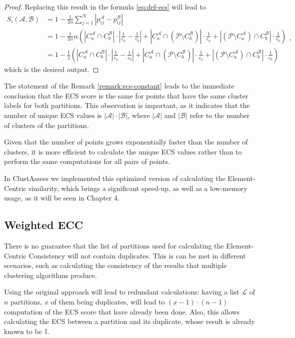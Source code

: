 \begin{proof}
    Replacing this result in the formula \ref{eq:def-ecs} will lead to
    \[
    \begin{aligned}
        S_i (\mathcal{A}, \mathcal{B}) &= 1 - \frac{1}{2 \alpha} \sum_{j = 1}^N |p_{ij}^{\mathcal{A}} - p_{ij}^{\mathcal{B}} |  \\
        &= 1 - \frac{1}{2\alpha}\alpha\left( |C_a^\mathcal{A} \cap C_b^\mathcal{B}|\cdot \left|\frac{1}{c_a} - \frac{1}{c_b}\right| + |C_a^\mathcal{A} \cap (\mathcal{P} \setminus C_b^{\mathcal{B}})| \cdot \frac{1}{c_a} + |(\mathcal{P} \setminus C_a^\mathcal{A}) \cap C_b^\mathcal{B}|\cdot \frac{1}{c_b} \right) \\
        &= 1 - \frac{1}{2}\left( |C_a^\mathcal{A} \cap C_b^\mathcal{B}|\cdot \left|\frac{1}{c_a} - \frac{1}{c_b}\right| + |C_a^\mathcal{A} \cap (\mathcal{P} \setminus C_b^{\mathcal{B}})| \cdot \frac{1}{c_a} + |(\mathcal{P} \setminus C_a^\mathcal{A}) \cap C_b^\mathcal{B}|\cdot \frac{1}{c_b} \right)
    \end{aligned} ,
    \]
    which is the desired output.
\end{proof}

The statement of the Remark \ref{remark:ecs-constant} leads to the immediate conclusion that the ECS score is the same for points that have the same cluster labels for both partitions. This observation is important, as it indicates that the number of unique ECS values is $|\mathcal{A}| \cdot |\mathcal{B}|$, where $|\mathcal{A}|$ and $|\mathcal{B}|$ refer to the number of clusters of the partitions.

Given that the number of points grows exponentially faster than the number of clusters, it is more efficient to calculate the unique ECS values rather than to perform the same computations for all pairs of points.

In ClustAssess we implemented this optimized version of calculating the Element-Centric similarity, which brings a significant speed-up, as well as a low-memory usage, as it will be seen in Chapter 4.

\subsection{Weighted ECC}
There is no guarantee that the list of partitions used for calculating the Element-Centric Consistency will not contain duplicates. This is can be met in different scenarios, such as calculating the consistency of the results that multiple clustering algorithms produce.

Using the original approach will lead to redundant calculations: having a list $\mathcal{L}$ of $n$ partitions, $x$ of them being duplicates, will lead to $(x-1) \cdot (n-1)$ computation of the ECS score that have already been done. Also, this allows calculating the ECS between a partition and its duplicate, whose result is already known to be 1.


